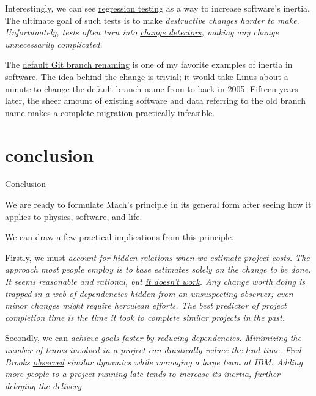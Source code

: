 \documentclass{article}
\begin{document}
Interestingly, we can see \href{https://en.wikipedia.org/wiki/Regression_testing}{regression testing} as a way to increase software's inertia.
The ultimate goal of such tests is to make \em{destructive} changes harder to make.
Unfortunately, tests often turn into \href{https://testing.googleblog.com/2015/01/testing-on-toilet-change-detector-tests.html}{change detectors}, making \em{any} change unnecessarily complicated.

The \href{https://github.com/github/renaming}{default Git branch renaming} is one of my favorite examples of inertia in software.
The idea behind the change is trivial; it would take Linus about a minute to change the default branch name from  to  back in 2005.
Fifteen years later, the sheer amount of existing software and data referring to the old branch name makes a complete migration practically infeasible.

\section{conclusion}{Conclusion}

We are ready to formulate Mach's principle in its general form after seeing how it applies to physics, software, and life.


We can draw a few practical implications from this principle.

Firstly, we must \em{account for hidden relations when we estimate project costs}.
The approach most people employ is to base estimates solely on the change to be done.
It seems reasonable and rational, but \href{https://en.wikipedia.org/wiki/Planning_fallacy}{it doesn't work}.
Any change worth doing is trapped in a web of dependencies hidden from an unsuspecting observer; even minor changes might require herculean efforts.
The best predictor of project completion time is the time it took to complete similar projects in the past.

Secondly, we can \em{achieve goals faster by reducing dependencies}.
Minimizing the number of teams involved in a project can drastically reduce the \href{https://www.investopedia.com/terms/l/leadtime.asp}{lead time}.
Fred Brooks \href{https://en.wikipedia.org/wiki/The_Mythical_Man-Month}{observed} similar dynamics while managing a large team at IBM:
Adding more people to a project running late tends to increase its inertia, further delaying the delivery.
\end{document}
